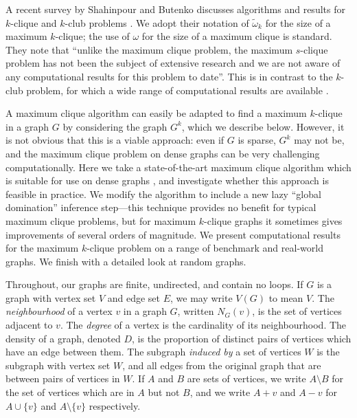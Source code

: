 \documentclass[letterpaper]{article}
\newcommand{\vertexset}{V}
\newcommand{\neighbourhood}{N}
\begin{document}
A recent survey by Shahinpour and Butenko discusses algorithms and results for $k$-clique and
$k$-club problems \cite{Shahinpour:2013}.  We adopt their notation of $\tilde{\omega}_k$ for the
size of a maximum $k$-clique; the use of $\omega$ for the size of a maximum clique is standard.
They note that ``unlike the maximum clique problem, the maximum $s$-clique problem has not been the
subject of extensive research and we are not aware of any computational results for this problem to
date''. This is in contrast to the $k$-club problem, for which a wide range of computational results
are available
\cite{Bourjolly:2000,Bourjolly:2002,Mahdavi:2012,Hartung:2012,Chang:2013,Shahinpour:2013,Wotzlaw:2014}.

A maximum clique algorithm can easily be adapted to find a maximum $k$-clique in a graph $G$ by
considering the graph $G^k$, which we describe below. However, it is not obvious that this is a
viable approach: even if $G$ is sparse, $G^k$ may not be, and the maximum clique problem on dense
graphs can be very challenging computationally. Here we take a state-of-the-art maximum clique
algorithm which is suitable for use on dense graphs \cite{Prosser:2012,McCreesh:2013}, and
investigate whether this approach is feasible in practice. We modify the algorithm to include a new
lazy ``global domination'' inference step---this technique provides no benefit for typical maximum
clique problems, but for maximum $k$-clique graphs it sometimes gives improvements of several orders
of magnitude. We present computational results for the maximum $k$-clique problem on a range of
benchmark and real-world graphs. We finish with a detailed look at random graphs.

Throughout, our graphs are finite, undirected, and contain no loops. If $G$ is a graph with vertex
set $V$ and edge set $E$, we may write $\vertexset(G)$ to mean $V$. The \emph{neighbourhood} of a
vertex $v$ in a graph $G$, written $\neighbourhood_G(v)$, is the set of vertices adjacent to $v$.
The \emph{degree} of a vertex is the cardinality of its neighbourhood. The density of a graph,
denoted $D$, is the proportion of distinct pairs of vertices which have an edge between them. The
subgraph \emph{induced by} a set of vertices $W$ is the subgraph with vertex set $W$, and all edges
from the original graph that are between pairs of vertices in $W$. If $A$ and $B$ are sets of
vertices, we write $A \setminus B$ for the set of vertices which are in $A$ but not $B$, and we
write $A + v$ and $A - v$ for $A \cup \{v\}$ and $A \setminus \{v\}$ respectively.
\end{document}
